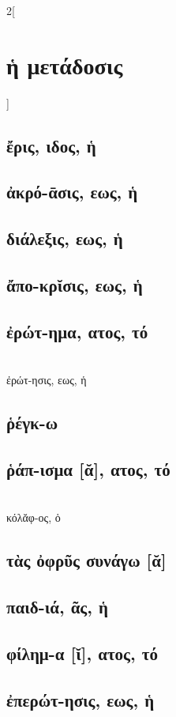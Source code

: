 \documentclass{book}
\begin{document}
\begin{multicols}{2}[\section{ἡ μετάδοσις}]
\subsection{ἔρις, ιδος, ἡ}
\subsection{ἀκρό-ᾱσις, εως, ἡ}
\subsection{διάλεξις, εως, ἡ}
\subsection{ἄπο-κρῐσις, εως, ἡ}
\subsection{ἐρώτ-ημα, ατος, τό}  ~\\
ἐρώτ-ησις, εως, ἡ
\subsection{ῥέγκ-ω}
\subsection{ῥάπ-ισμα [ᾰ], ατος, τό}  ~\\
κόλᾰφ-ος, ὁ 
\subsection{τὰς ὀφρῦς συνάγω [ᾰ]}
\subsection{παιδ-ιά, ᾶς, ἡ}
\subsection{φίλημ-α [ῐ], ατος, τό}
\subsection{ἐπερώτ-ησις, εως, ἡ}

\end{multicols}
\end{document}

